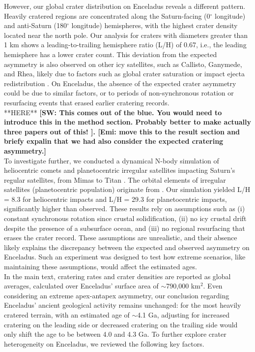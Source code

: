 \documentclass[preprint,11pt,3p,times,authoryear]{elsarticle}
\begin{document}
{However, our global crater distribution on Enceladus reveals a different pattern. Heavily cratered regions are concentrated along the Saturn-facing (0$^\circ$ longitude) and anti-Saturn (180$^\circ$ longitude) hemispheres, with the highest crater density located near the north pole. Our analysis for craters with diameters greater than 1 km shows a leading-to-trailing hemisphere ratio (L/H) of 0.67, i.e., the leading hemisphere has a lower crater count. This deviation from the expected asymmetry is also observed on other icy satellites, such as Callisto, Ganymede, and Rhea, likely due to factors such as global crater saturation or impact ejecta redistribution \citep{Zahnle2003,Xu2017,Schenk2020}. On Enceladus, the absence of the expected crater asymmetry could be due to similar factors, or to periods of non-synchronous rotation or resurfacing events that erased earlier cratering records.\\
**HERE**
\textbf{[SW: This comes out of the blue. You would need to introduce this in the method section. Probably better to make actually three papers out of this!
]. [Emi: move this to the result section and briefy expalin that we had also consider the expected
cratering asymmetry.]\\}
To investigate further, we conducted a dynamical N-body simulation of heliocentric comets and planetocentric irregular satellites impacting Saturn's regular satellites, from Mimas to Titan \citep{Wong2021}. The  orbital elements of irregular satellites (planetocentric population) originate from \citet{Nesvorny2007}. Our simulation yielded L/H = 8.3 for heliocentric impacts and L/H = 29.3 for planetocentric impacts, significantly higher than observed. These results rely on assumptions such as (i) constant synchronous rotation since crustal solidification, (ii) no icy crustal drift despite the presence of a subsurface ocean, and (iii) no regional resurfacing that erases the crater record. These assumptions are unrealistic, and their absence likely explains the discrepancy between the expected and observed asymmetry on Enceladus. Such an experiment was designed to test how extreme scenarios, like maintaining these assumptions, would affect the estimated ages.\\

In the main text, cratering rates and crater densities are reported as global averages, calculated over Enceladus' surface area of $\sim$790,000 km$^2$. Even considering an extreme apex-antapex asymmetry, our conclusion regarding Enceladus' ancient geological activity remains unchanged: for the most heavily cratered terrain, with an estimated age of $\sim$4.1 Ga, adjusting for increased cratering on the leading side or decreased cratering on the trailing side would only shift the age to be between 4.0 and 4.3 Ga. To further explore crater heterogeneity on Enceladus, we reviewed the following key factors.\\

}
\end{document}

